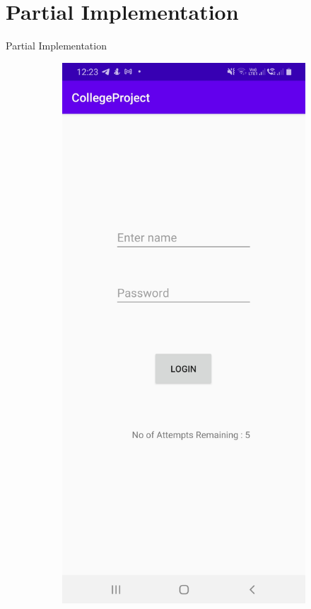 \documentclass{beamer}
\begin{document}
\section{Partial Implementation}
\begin{frame}[allowframebreaks]{Partial Implementation}
	\begin{figure}
           \begin{subfigure}[b]{0.2\linewidth}
			{\includegraphics[width=\linewidth]{App_1}}

\end{subfigure}
\end{figure}
\end{frame}
\end{document}
